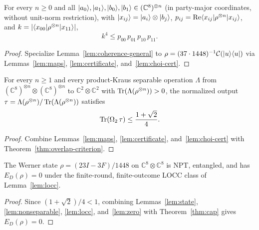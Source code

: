 \begin{lemma}
\label{lem:coherence}
\leanok
{}
For every $n\ge 0$ and all $|a_0\rangle,|a_1\rangle,|b_0\rangle,|b_1\rangle\in(\mathbb{C}^8)^{\otimes n}$ (in party-major coordinates, without unit-norm restriction), with $|x_{ij}\rangle = |a_i\rangle\otimes|b_j\rangle$, $p_{ij} = \operatorname{Re}\langle x_{ij}|\rho^{\otimes n}|x_{ij}\rangle$, and $k = |\langle x_{00}|\rho^{\otimes n}|x_{11}\rangle|$,
\[
  k^4 \le p_{00}\,p_{01}\,p_{10}\,p_{11}.
\]
\end{lemma}
\begin{proof}
\leanok
Specialize Lemma~\ref{lem:coherence-general} to $\rho = (37\cdot 1448)^{-1}\mathcal{C}(|u\rangle\langle u|)$ via Lemmas~\ref{lem:maps}, \ref{lem:certificate}, and~\ref{lem:choi-cert}.
\end{proof}

\begin{theorem}
\label{thm:cap}
\leanok
{}
For every $n\ge 1$ and every product-Kraus separable operation $\Lambda$ from $(\mathbb{C}^8)^{\otimes n}\otimes(\mathbb{C}^8)^{\otimes n}$ to $\mathbb{C}^2\otimes\mathbb{C}^2$ with $\operatorname{Tr}(\Lambda(\rho^{\otimes n}))>0$, the normalized output $\tau = \Lambda(\rho^{\otimes n})/\operatorname{Tr}(\Lambda(\rho^{\otimes n}))$ satisfies
\[
  \operatorname{Tr}(\Omega_2\,\tau) \le \frac{1+\sqrt{2}}{4}.
\]
\end{theorem}
\begin{proof}
\leanok
Combine Lemmas~\ref{lem:maps}, \ref{lem:certificate}, and~\ref{lem:choi-cert} with Theorem~\ref{thm:overlap-criterion}.
\end{proof}

\begin{theorem}
\label{thm:zero-rate}
\leanok
{}
The Werner state $\rho=(23I-3F)/1448$ on $\mathbb{C}^8\otimes\mathbb{C}^8$ is NPT, entangled, and has $E_D(\rho)=0$ under the finite-round, finite-outcome LOCC class of Lemma~\ref{lem:locc}.
\end{theorem}
\begin{proof}
\leanok
Since $(1+\sqrt{2})/4 < 1$, combining Lemmas~\ref{lem:state}, \ref{lem:nonseparable}, \ref{lem:locc}, and~\ref{lem:zero} with Theorem~\ref{thm:cap} gives $E_D(\rho)=0$.
\end{proof}

